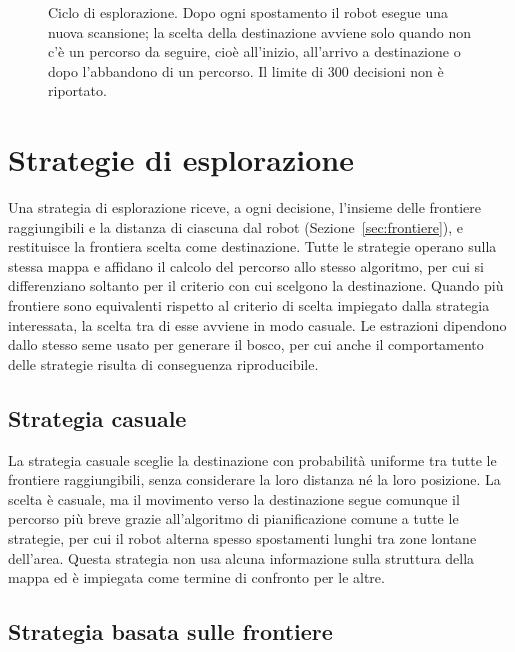 \begin{figure}[!htb]
    \centering
    
    \caption[Ciclo di esplorazione]{Ciclo di esplorazione. Dopo ogni spostamento il robot esegue una nuova scansione; la scelta della destinazione avviene solo quando non c'è un percorso da seguire, cioè all'inizio, all'arrivo a destinazione o dopo l'abbandono di un percorso. Il limite di 300 decisioni non è riportato.}
    \label{fig:ciclo}
\end{figure}

\section{Strategie di esplorazione}
\label{sec:strategie}

Una strategia di esplorazione riceve, a ogni decisione, l'insieme delle frontiere raggiungibili e la distanza di ciascuna dal robot (Sezione~\ref{sec:frontiere}), e restituisce la frontiera scelta come destinazione. Tutte le strategie operano sulla stessa mappa e affidano il calcolo del percorso allo stesso algoritmo, per cui si differenziano soltanto per il criterio con cui scelgono la destinazione. Quando più frontiere sono equivalenti rispetto al criterio di scelta impiegato dalla strategia interessata, la scelta tra di esse avviene in modo casuale. Le estrazioni dipendono dallo stesso seme usato per generare il bosco, per cui anche il comportamento delle strategie risulta di conseguenza riproducibile.

\subsection{Strategia casuale}
\label{sec:casuale}

La strategia casuale sceglie la destinazione con probabilità uniforme tra tutte le frontiere raggiungibili, senza considerare la loro distanza né la loro posizione. La scelta è casuale, ma il movimento verso la destinazione segue comunque il percorso più breve grazie all'algoritmo di pianificazione comune a tutte le strategie, per cui il robot alterna spesso spostamenti lunghi tra zone lontane dell'area. Questa strategia non usa alcuna informazione sulla struttura della mappa ed è impiegata come termine di confronto per le altre.

\subsection{Strategia basata sulle frontiere}
\label{sec:frontier}

